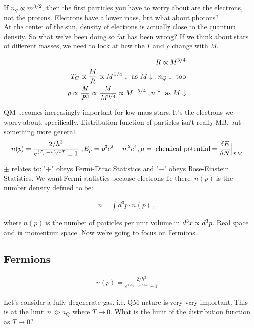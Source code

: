 If $n_q \propto m^{3/2}$, then the first particles you have to worry about are the electrons, not the protons. Electrons have a lower mass, but what about photons? \\

At the center of the sun, density of electrons is actually close to the quantum density. So what we've been doing so far has been wrong? If we think about stars of different masses, we need to look at how the $T$ and $\rho$ change with $M$. 

\begin{align}
R \propto M^{3/4}\\
T_C \propto \frac{M}{R} \propto M^{1/4} \downarrow \text{ as } M \downarrow~, n_Q \downarrow \text{ too}\\
\rho \propto \frac{M}{R^3} \propto \frac{M}{M^{9/4}} \propto M^{-5/4}~, n \uparrow \text{ as } M \downarrow\\
\end{align}

QM becomes increasingly important for low mass stars. It's the electrons we worry about, specifically. Distribution function of particles isn't really MB, but something more general.\\

\begin{align}
n(p)= \frac{2/h^3}{e^{(E_p - \mu)/kT} \pm 1}~, E_p = p^2 c^2 + m^2 c^4,\mu = \text{ chemical potential} = \frac{\delta E}{ \delta N} \Bigl\lvert_{S,V}
\end{align}

$\pm$ relates to: "$+$" obeys Fermi-Dirac Statistics and "$-$" obeys Bose-Einstein Statistics. We want Fermi statistics because electrons lie there. $n(p)$ is the number density defined to be: 

\begin{align}
n= \int d^3 p \cdot n(p)~,
\end{align}

where $n(p)$ is the number of particles per unit volume in $d^3x \propto d^3p$. Real space and in momentum space. Now we're going to focus on Fermions...

\subsection{Fermions}

\begin{align}
n(p)= \frac{2/h^3}{e^{(E_p - \mu)/kT} + 1}
\end{align}

Let's consider a fully degenerate gas. i.e. QM nature is very very important. This is at the limit $n \gg n_Q$ where $T \rightarrow 0$. What is the limit of the distribution function as $T \rightarrow 0$? 

